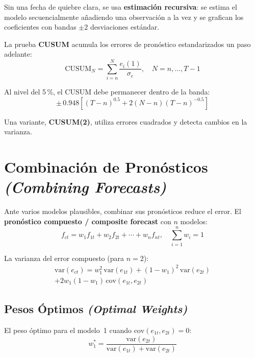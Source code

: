 \documentclass[12pt]{article}
\begin{document}
Sin una fecha de quiebre clara, se usa \textbf{estimaci\'on recursiva}: se estima el modelo secuencialmente a\~nadiendo una observaci\'on a la vez y se grafican los coeficientes con bandas $\pm 2$ desviaciones est\'andar.

La prueba \textbf{CUSUM} acumula los errores de pron\'ostico estandarizados un paso adelante:
\begin{equation}
\text{CUSUM}_N = \sum_{i=n}^{N}\frac{e_i(1)}{\sigma_e},
  \quad N = n, \ldots, T-1
\end{equation}

Al nivel del 5\,\%, el CUSUM debe permanecer dentro de la banda:
\begin{equation}
\pm\,0.948\!\left[(T-n)^{0.5} + 2(N-n)(T-n)^{-0.5}\right]
\end{equation}

Una variante, \textbf{CUSUM(2)}, utiliza errores cuadrados y detecta cambios en la varianza.

\section{Combinaci\'on de Pron\'osticos \textit{(Combining Forecasts)}}

Ante varios modelos plausibles, combinar sus pron\'osticos reduce el error. El \textbf{pron\'ostico compuesto / composite forecast} con $n$ modelos:
\begin{equation}
f_{ct} = w_1 f_{1t} + w_2 f_{2t} + \cdots + w_n f_{nt},
  \quad \sum_{i=1}^n w_i = 1
\end{equation}

La varianza del error compuesto (para $n = 2$):
\begin{multline}
\text{var}(e_{ct})
  = w_1^2\,\text{var}(e_{1t})
  + (1-w_1)^2\,\text{var}(e_{2t})\\
  + 2w_1(1-w_1)\,\text{cov}(e_{1t},e_{2t})
\end{multline}

\subsection{Pesos \'Optimos \textit{(Optimal Weights)}}

El peso \'optimo para el modelo~1 cuando $\text{cov}(e_{1t},e_{2t})=0$:
\begin{equation}
w_1^* = \frac{\text{var}(e_{2t})}{\text{var}(e_{1t})+\text{var}(e_{2t})}
\end{equation}
\end{document}
